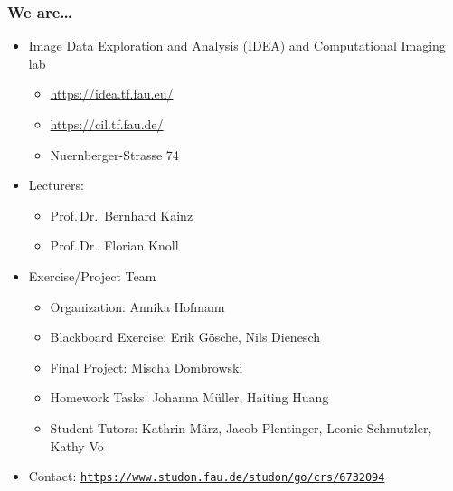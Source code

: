 
\usepackage{soul} %

\subtitle{Motivation}




\nocite{*}

\frame[plain,c]{\titlepage} %

\begin{frame}
	\frametitle{We are\ldots}
	\begin{itemize}
		\setlength\itemsep{0.3cm}
		\item Image Data Exploration and Analysis (IDEA) and Computational Imaging lab
		\begin{itemize}
			\item \url{https://idea.tf.fau.eu/}
			\item \url{https://cil.tf.fau.de/}
			\item Nuernberger-Strasse 74
		\end{itemize}
		\item Lecturers:
		\begin{itemize}
			\item Prof.\,Dr.\ Bernhard Kainz
			\item Prof.\,Dr.\ Florian Knoll
		\end{itemize}
		\item Exercise/Project Team
		\begin{itemize}
			\item Organization: \tabto{3cm} Annika Hofmann
			\item Blackboard Exercise: \tabto{3cm} Erik G\"osche, Nils Dienesch
			\item Final Project: \tabto{3cm} Mischa Dombrowski
			\item Homework Tasks: \tabto{3cm} Johanna M\"uller, Haiting Huang
			\item Student Tutors: \tabto{3cm} Kathrin M\"arz, Jacob Plentinger, Leonie Schmutzler, Kathy Vo
		\end{itemize}
		\item Contact: \texttt{\url{https://www.studon.fau.de/studon/go/crs/6732094}}
	\end{itemize}
\end{frame}

